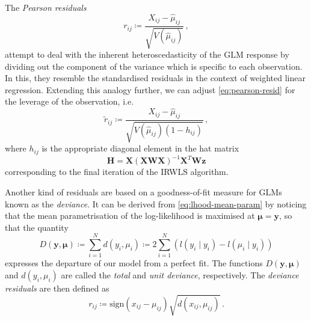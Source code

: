 \documentclass[a4paper]{book}
\begin{document}
The \emph{Pearson residuals}
\begin{equation} \label{eq:pearson-resid}
  r_{ij} \coloneqq \frac{X_{ij} - \widehat{\mu}_{ij}}{\sqrt{V(\widehat{\mu}_{ij})}} \,,
\end{equation}
attempt to deal with the inherent heteroscedasticity of the GLM response by dividing out the component of the variance which is specific to each observation. In this, they resemble the standardised residuals in the context of weighted linear regression. Extending this analogy further, we can adjust \cref{eq:pearson-resid} for the leverage of the observation, i.e.
\begin{equation}
  \tilde{r}_{ij} \coloneqq \frac{X_{ij} - \widehat{\mu}_{ij}}{\sqrt{V(\widehat{\mu}_{ij}) (1 - h_{ij})}} \,,
\end{equation}
where $h_{ij}$ is the appropriate diagonal element in the hat matrix
\begin{equation}
  \mathbf{H} = \mathbf{X} (\mathbf{XWX})^{-1} \mathbf{X}^T \mathbf{W} \mathbf{z}
\end{equation}
corresponding to the final iteration of the IRWLS algorithm.

Another kind of residuals are based on a goodness-of-fit measure for GLMs known as the \emph{deviance}. It can be derived from \cref{eq:lhood-mean-param} by noticing that the mean parametrisation of the log-likelihood is maximised at $\bm{\mu} = \mathbf{y}$, so that the quantity
\begin{equation}
  D(\mathbf{y}, \bm{\mu}) \coloneqq \sum_{i = 1}^N d(y_i, \mu_i) \coloneqq 2 \sum_{i = 1}^N (l(y_i \mid y_i) - l(\widehat{\mu}_i \mid y_i)) 
\end{equation}
expresses the departure of our model from a perfect fit. The functions $D(\mathbf{y}, \bm{\mu})$ and $d(y_i, \mu_i)$ are called the \emph{total} and \emph{unit deviance}, respectively. The \emph{deviance residuals} are then defined as
\begin{equation}
  r_{ij} \coloneqq \mathrm{sign}(x_{ij} - \mu_{ij}) \sqrt{d(x_{ij}, \mu_{ij})} \,.
\end{equation}
\end{document}

